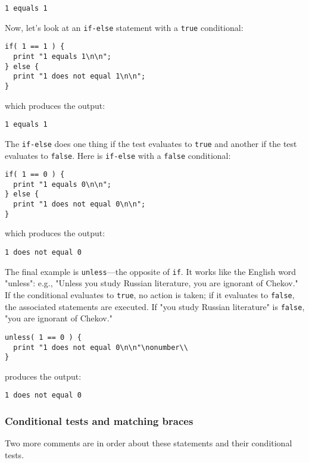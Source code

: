 \begin{lstlisting}
1 equals 1
\end{lstlisting}

Now, let's look at an \verb|if-else| statement with a \verb|true| conditional:

\begin{lstlisting}
if( 1 == 1 ) {
  print "1 equals 1\n\n";
} else {
  print "1 does not equal 1\n\n";
}
\end{lstlisting}

which produces the output:

\begin{lstlisting}
1 equals 1
\end{lstlisting}

The \verb|if-else| does one thing if the test evaluates to \verb|true| and another if the test evaluates to \verb|false|. Here is \verb|if-else| with a \verb|false| conditional: 

\begin{lstlisting}
if( 1 == 0 ) {
  print "1 equals 0\n\n";
} else {
  print "1 does not equal 0\n\n";
}
\end{lstlisting}

which produces the output:

\begin{lstlisting}
1 does not equal 0
\end{lstlisting}

The final example is \verb|unless|—the opposite of \verb|if|. It works like the English word "unless": e.g., "Unless you study Russian literature, you are ignorant of Chekov." If the conditional evaluates to \verb|true|, no action is taken; if it evaluates to \verb|false|, the associated statements are executed. If "you study Russian literature" is \verb|false|, "you are ignorant of Chekov." 

\begin{lstlisting}
unless( 1 == 0 ) {
  print "1 does not equal 0\n\n"\nonumber\\
}
\end{lstlisting}

produces the output:

\begin{lstlisting}
1 does not equal 0
\end{lstlisting}

\subsubsection{Conditional tests and matching braces}
Two more comments are in order about these statements and their conditional tests.

